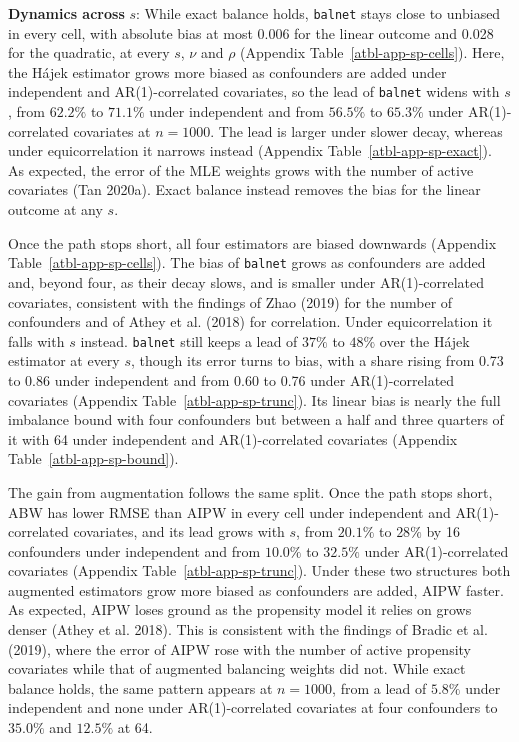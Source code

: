\documentclass[
  12pt,
  a4paper,
]{article}
\newcounter{none} %
\begin{document}
\textbf{Dynamics across} \(s\): While exact balance holds,
\texttt{balnet} stays close to unbiased in every cell, with absolute
bias at most 0.006 for the linear outcome and 0.028 for the quadratic,
at every \(s\), \(\nu\) and \(\rho\)
(Appendix Table~\ref{atbl-app-sp-cells}). Here, the Hájek estimator
grows more biased as confounders are added under independent and
AR(1)-correlated covariates, so the lead of \texttt{balnet} widens with
\(s\), from \(62.2\%\) to \(71.1\%\) under independent and from
\(56.5\%\) to \(65.3\%\) under AR(1)-correlated covariates at
\(n = 1000\). The lead is larger under slower decay, whereas under
equicorrelation it narrows instead
(Appendix Table~\ref{atbl-app-sp-exact}). As expected, the error of the
MLE weights grows with the number of active covariates (Tan 2020a).
Exact balance instead removes the bias for the linear outcome at any
\(s\).

Once the path stops short, all four estimators are biased downwards
(Appendix Table~\ref{atbl-app-sp-cells}). The bias of \texttt{balnet}
grows as confounders are added and, beyond four, as their decay slows,
and is smaller under AR(1)-correlated covariates, consistent with the
findings of Zhao (2019) for the number of confounders and of Athey et
al. (2018) for correlation. Under equicorrelation it falls with \(s\)
instead. \texttt{balnet} still keeps a lead of \(37\%\) to \(48\%\) over
the Hájek estimator at every \(s\), though its error turns to bias, with
a share rising from 0.73 to 0.86 under independent and from 0.60 to 0.76
under AR(1)-correlated covariates
(Appendix Table~\ref{atbl-app-sp-trunc}). Its linear bias is nearly the
full imbalance bound with four confounders but between a half and three
quarters of it with 64 under independent and AR(1)-correlated covariates
(Appendix Table~\ref{atbl-app-sp-bound}).

The gain from augmentation follows the same split. Once the path stops
short, ABW has lower RMSE than AIPW in every cell under independent and
AR(1)-correlated covariates, and its lead grows with \(s\), from
\(20.1\%\) to \(28\%\) by 16 confounders under independent and from
\(10.0\%\) to \(32.5\%\) under AR(1)-correlated covariates
(Appendix Table~\ref{atbl-app-sp-trunc}). Under these two structures
both augmented estimators grow more biased as confounders are added,
AIPW faster. As expected, AIPW loses ground as the propensity model it
relies on grows denser (Athey et al. 2018). This is consistent with the
findings of Bradic et al. (2019), where the error of AIPW rose with the
number of active propensity covariates while that of augmented balancing
weights did not. While exact balance holds, the same pattern appears at
\(n = 1000\), from a lead of \(5.8\%\) under independent and none under
AR(1)-correlated covariates at four confounders to \(35.0\%\) and
\(12.5\%\) at 64.
\end{document}
